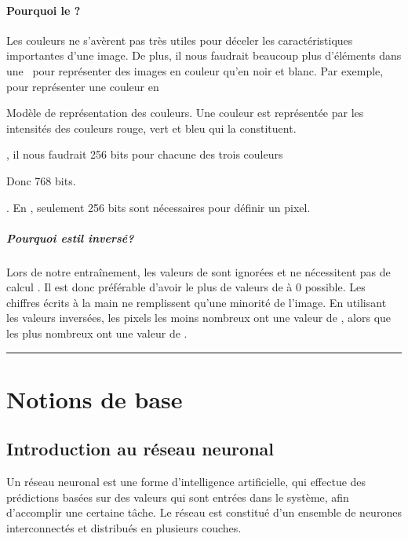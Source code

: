 \documentclass[letterpaper,10pt,french]{sphinxmanual}
\begin{document}
\paragraph{Pourquoi le ?}
\label{\detokenize{preprocessing:pourquoi-le-grayscale}}
Les couleurs ne s’avèrent pas très utiles  pour déceler les caractéristiques importantes d’une image. De plus, il nous faudrait beaucoup plus d’éléments dans une  pour représenter des images en couleur qu’en noir et blanc. Par exemple, pour représenter une couleur en %
\begin{footnote}[33]\sphinxAtStartFootnote
Modèle de représentation des couleurs. Une couleur est représentée par les intensités des couleurs rouge, vert et bleu qui la constituent.
%
\end{footnote}, il nous faudrait 256 bits pour chacune des trois couleurs%
\begin{footnote}[34]\sphinxAtStartFootnote
Donc 768 bits.
%
\end{footnote}. En , seulement 256 bits sont nécessaires pour définir un pixel.


\subparagraph{Pourquoi est\sphinxhyphen{}il inversé?}
\label{\detokenize{preprocessing:pourquoi-est-il-inverse}}
Lors de notre entraînement, les valeurs de sont ignorées et ne nécessitent pas de calcul . Il est donc préférable d’avoir le plus de valeurs de  à 0 possible. Les chiffres écrits à la main ne remplissent qu’une minorité de l’image. En utilisant les valeurs inversées, les pixels les moins nombreux ont une valeur de , alors que les plus nombreux ont une valeur de .


\bigskip\hrule\bigskip



\section{Notions de base}
\label{\detokenize{notions_de_base:notions-de-base}}\label{\detokenize{notions_de_base::doc}}

\subsection{Introduction au réseau neuronal}
\label{\detokenize{notions_de_base:introduction-au-reseau-neuronal}}
Un réseau neuronal est une forme d’intelligence artificielle, qui effectue des prédictions basées sur des valeurs qui sont entrées dans le système,
afin d’accomplir une certaine tâche. Le réseau est constitué d’un ensemble de neurones interconnectés et distribués en plusieurs couches.
\end{document}
